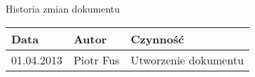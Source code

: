\documentclass[11pt,a4paper]{article}
\begin{document}
  {\Large Historia zmian dokumentu}
  \begin{center}
    \begin{tabular}{ | l | l | l | }
      \rowcolor{historiaZmianNaglowek}
      \hline
      Data & Autor & Czynność \\ \hline
      01.04.2013 & Piotr Fus & Utworzenie dokumentu \\ \hline
    \end{tabular}
  \end{center}
\end{document}
